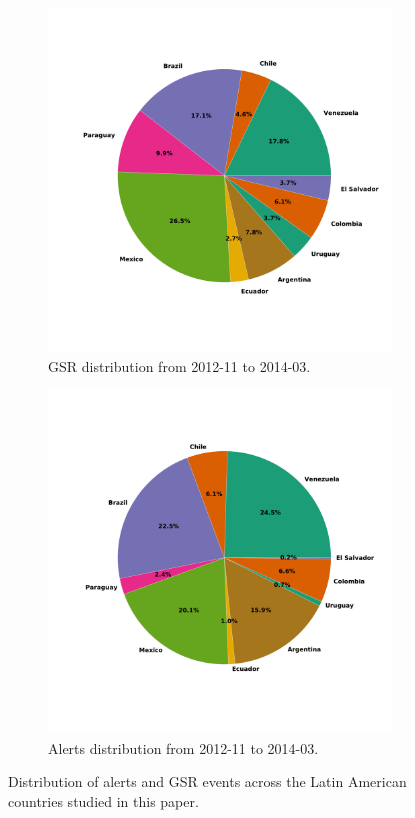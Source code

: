 \documentclass[letterpaper]{article}
\begin{document}
\begin{figure}
\centering
\begin{subfigure}{0.5\columnwidth}
  \centering
  \includegraphics[scale=0.25]{gsr_distribution} 
  \caption{GSR distribution from 2012-11 to 2014-03.}
  \label{fig:gsrdistribution}
\end{subfigure}%
\begin{subfigure}{.7\columnwidth}
  \centering
  \includegraphics[scale=0.25]{pp_dist}
  \caption{Alerts distribution from 2012-11 to 2014-03.}
  \label{fig:ppdistribution}
\end{subfigure}
\caption{Distribution of alerts and GSR events across the Latin American countries studied in this paper.}
\label{fig:distribution}
\end{figure}
\end{document}
